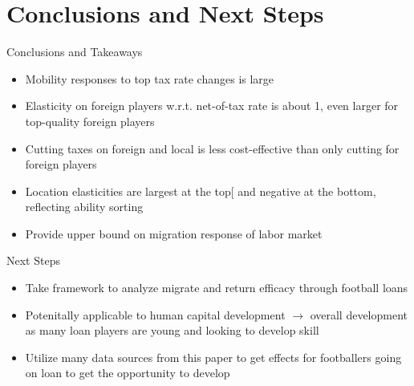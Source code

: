 \documentclass[aspectratio=169,professionalfonts]{beamer}
\begin{document}
\section{Conclusions and Next Steps}

\begin{frame}{Conclusions and Takeaways}
  \begin{itemize}
    \item Mobility responses to top tax rate changes is large
    \item Elasticity on foreign players w.r.t. net-of-tax rate is about 1, even larger for top-quality foreign players
    \item Cutting taxes on foreign and local is less cost-effective than only cutting for foreign players
    \item Location elasticities are largest at the top[ and negative at the bottom, reflecting ability sorting
    \item Provide upper bound on migration response of labor market
  \end{itemize}
\end{frame}

\begin{frame}{Next Steps}
  \begin{itemize}
    \item Take framework to analyze migrate and return efficacy through football loans
    \item Potenitally applicable to human capital development $\rightarrow$ overall development as many loan players are young and looking to develop skill
    \item Utilize many data sources from this paper to get effects for footballers going on loan to get the opportunity to develop
  \end{itemize}
\end{frame}
\end{document}
